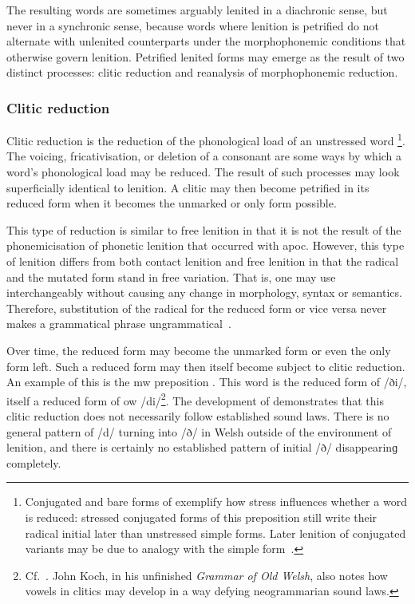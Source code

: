 The resulting words are sometimes  arguably lenited in a diachronic sense, but never in a synchronic sense, because words where lenition is petrified do not alternate with unlenited counterparts under the morphophonemic conditions that otherwise govern lenition. Petrified lenited forms may emerge as the result of two distinct processes: clitic reduction and reanalysis of morphophonemic reduction.

\subsubsection{Clitic reduction}
\label{sec:clitic-reduction}
Clitic reduction is the reduction of the phonological load of an unstressed word%
\footnote{Conjugated and bare forms of  exemplify how stress influences whether a word is reduced: stressed conjugated forms of this preposition still write their radical initial later than unstressed simple forms. Later lenition of conjugated variants may be due to analogy with the simple form~\autocite[54]{jongeleen_lenition_2016}.}. 
The voicing, fricativisation, or deletion of a consonant are some ways by which a word's phonological load may be reduced.
The result of such processes may look superficially identical to lenition.
A clitic may then become petrified in its reduced form when it becomes the unmarked or only form possible. 

This type of reduction is similar to free lenition in that it is not the result of the phonemicisation of phonetic lenition that occurred with \gls{apoc}.
However, this type of lenition differs from both contact lenition and free lenition in that the radical and the mutated form stand in free variation.
That is, one may use  interchangeably without causing any change in morphology, syntax or semantics. 
Therefore, substitution of the radical for the reduced form or vice versa never makes a grammatical phrase ungrammatical~\autocite[451--453]{morgan_y_1952}. 

Over time, the reduced form may become the unmarked form or even the only form left. 
Such a reduced form may then itself become subject to clitic reduction. 
An example of this is the \gls{mw} preposition . 
This word is the reduced form of  /ði/, itself a reduced form of \gls{ow}  /di/\footnote{Cf.\ . John Koch, in his unfinished \emph{Grammar of Old Welsh}, also notes how vowels in clitics may develop in a way defying neogrammarian sound laws.}. 
The development of  demonstrates that this clitic reduction does not necessarily follow established sound laws. 
There is no general pattern of /d/ turning into /ð/ in Welsh outside of the environment of lenition, and there is certainly no established pattern of initial /ð/ disappearinɡ completely.

